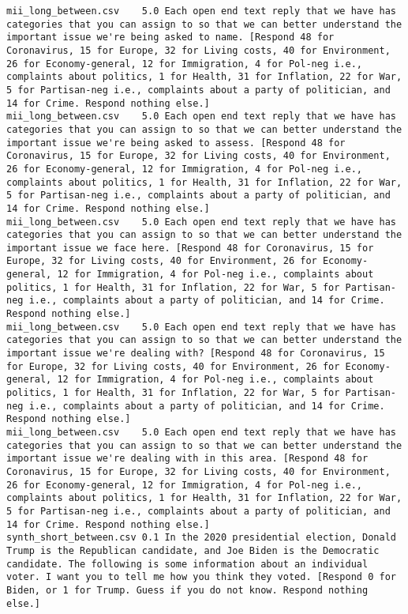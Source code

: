 \begin{lstlisting}[label=lst:promptvariants]
mii_long_between.csv	5.0	Each open end text reply that we have has categories that you can assign to so that we can better understand the important issue we're being asked to name. [Respond 48 for Coronavirus, 15 for Europe, 32 for Living costs, 40 for Environment, 26 for Economy-general, 12 for Immigration, 4 for Pol-neg i.e., complaints about politics, 1 for Health, 31 for Inflation, 22 for War, 5 for Partisan-neg i.e., complaints about a party of politician, and 14 for Crime. Respond nothing else.]
mii_long_between.csv	5.0	Each open end text reply that we have has categories that you can assign to so that we can better understand the important issue we're being asked to assess. [Respond 48 for Coronavirus, 15 for Europe, 32 for Living costs, 40 for Environment, 26 for Economy-general, 12 for Immigration, 4 for Pol-neg i.e., complaints about politics, 1 for Health, 31 for Inflation, 22 for War, 5 for Partisan-neg i.e., complaints about a party of politician, and 14 for Crime. Respond nothing else.]
mii_long_between.csv	5.0	Each open end text reply that we have has categories that you can assign to so that we can better understand the important issue we face here. [Respond 48 for Coronavirus, 15 for Europe, 32 for Living costs, 40 for Environment, 26 for Economy-general, 12 for Immigration, 4 for Pol-neg i.e., complaints about politics, 1 for Health, 31 for Inflation, 22 for War, 5 for Partisan-neg i.e., complaints about a party of politician, and 14 for Crime. Respond nothing else.]
mii_long_between.csv	5.0	Each open end text reply that we have has categories that you can assign to so that we can better understand the important issue we're dealing with? [Respond 48 for Coronavirus, 15 for Europe, 32 for Living costs, 40 for Environment, 26 for Economy-general, 12 for Immigration, 4 for Pol-neg i.e., complaints about politics, 1 for Health, 31 for Inflation, 22 for War, 5 for Partisan-neg i.e., complaints about a party of politician, and 14 for Crime. Respond nothing else.]
mii_long_between.csv	5.0	Each open end text reply that we have has categories that you can assign to so that we can better understand the important issue we're dealing with in this area. [Respond 48 for Coronavirus, 15 for Europe, 32 for Living costs, 40 for Environment, 26 for Economy-general, 12 for Immigration, 4 for Pol-neg i.e., complaints about politics, 1 for Health, 31 for Inflation, 22 for War, 5 for Partisan-neg i.e., complaints about a party of politician, and 14 for Crime. Respond nothing else.]
synth_short_between.csv	0.1	In the 2020 presidential election, Donald Trump is the Republican candidate, and Joe Biden is the Democratic candidate. The following is some information about an individual voter. I want you to tell me how you think they voted. [Respond 0 for Biden, or 1 for Trump. Guess if you do not know. Respond nothing else.]

\end{lstlisting}

